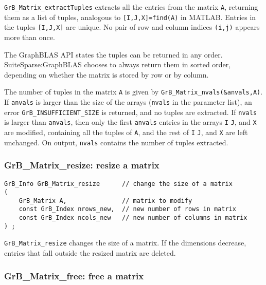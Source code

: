 \documentclass[12pt]{article}
\begin{document}
\verb'GrB_Matrix_extractTuples' extracts all the entries from the matrix
\verb'A', returning them as a list of tuples, analogous to
\verb'[I,J,X]=find(A)' in MATLAB.  Entries in the tuples \verb'[I,J,X]' are
unique.  No pair of row and column indices \verb'(i,j)' appears more than once.

The GraphBLAS API states the tuples can be returned in any order.
SuiteSparse:GraphBLAS chooses to always return them in sorted order, depending
on whether the matrix is stored by row or by column.

The number of tuples in the matrix \verb'A' is given by
\verb'GrB_Matrix_nvals(&anvals,A)'.  If \verb'anvals' is larger than the size
of the arrays (\verb'nvals' in the parameter list), an error
\verb'GrB_INSUFFICIENT_SIZE' is returned, and no tuples are extracted.  If
\verb'nvals' is larger than \verb'anvals', then only the first \verb'anvals'
entries in the arrays \verb'I' \verb'J', and \verb'X' are modified, containing
all the tuples of \verb'A', and the rest of \verb'I' \verb'J', and \verb'X' are
left unchanged.  On output, \verb'nvals' contains the number of tuples
extracted.

\subsubsection{{\sf GrB\_Matrix\_resize:}          resize a matrix}
\label{matrix_resize}

\begin{mdframed}[userdefinedwidth=6in]
{\footnotesize
\begin{verbatim}
GrB_Info GrB_Matrix_resize      // change the size of a matrix
(
    GrB_Matrix A,               // matrix to modify
    const GrB_Index nrows_new,  // new number of rows in matrix
    const GrB_Index ncols_new   // new number of columns in matrix
) ;
\end{verbatim} } \end{mdframed}

\verb'GrB_Matrix_resize' changes the size of a matrix.
If the dimensions decrease, entries that fall outside the resized
matrix are deleted.

\subsubsection{{\sf GrB\_Matrix\_free:} free a matrix}
\label{matrix_free}
\end{document}
